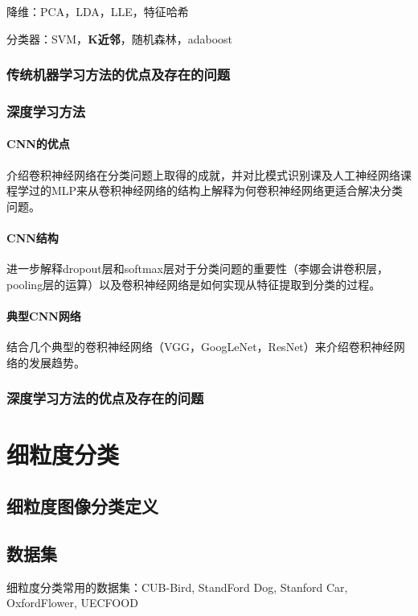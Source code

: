 \documentclass[UTF8]{article}
\begin{document}
降维：PCA，LDA，LLE，特征哈希

分类器：SVM，\textbf{K近邻}，随机森林，adaboost
\subsubsection{传统机器学习方法的优点及存在的问题}
\subsubsection{ 深度学习方法}
\paragraph{CNN的优点}
介绍卷积神经网络在分类问题上取得的成就，并对比模式识别课及人工神经网络课程学过的MLP来从卷积神经网络的结构上解释为何卷积神经网络更适合解决分类问题。

{\color{red}{ Experiments: LeNet在MNIST数据集上训练，主要为引入卷积神经网络分类 }}
\paragraph{CNN结构}
进一步解释dropout层和softmax层对于分类问题的重要性（李娜会讲卷积层，pooling层的运算）以及卷积神经网络是如何实现从特征提取到分类的过程。

{\color{red}{ Experiments: AlexNet在MNIST数据集和CIFAR-10数据集上的训练，重点观察AlexNet在分类问题上的提升，并对比有无dropout层来看dropout层对分类问题的重要性。}}
\paragraph{典型CNN网络}
结合几个典型的卷积神经网络（VGG，GoogLeNet，ResNet）来介绍卷积神经网络的发展趋势。

{\color{red}{ Experiments: MNIST数据集和CIFAR-10数据集上训练AlexNet，VGG，ResNet的实验，并结合五个评价指标对比其结果}}

\subsubsection{深度学习方法的优点及存在的问题}
\section{细粒度分类}
\subsection{细粒度图像分类定义}
\subsection{数据集}
细粒度分类常用的数据集：CUB-Bird, StandFord Dog, Stanford Car, OxfordFlower, UECFOOD
\end{document}
